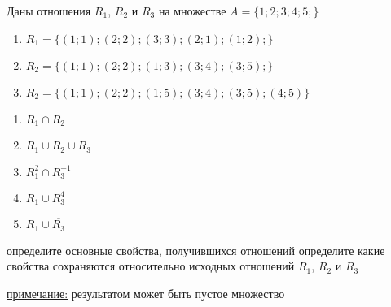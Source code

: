\question
Даны отношения $R_1$, $R_2$ и $R_3$ на множестве $A = \{1; 2; 3; 4; 5;\}$ 
\begin{enumerate}
	\renewcommand{\labelenumi}{\alph{enumi})}
	\item $R_1 = \{(1; 1); (2; 2); (3; 3); (2; 1); (1; 2); \}$
	\item $R_2 = \{(1; 1); (2; 2); (1; 3); (3; 4); (3; 5);\}$
	\item $R_2 = \{(1; 1); (2; 2);  (1; 5); (3; 4); (3; 5); (4; 5)\}$
\end{enumerate}

\begin{enumerate}
	\renewcommand{\labelenumi}{\alph{enumi})}
	\item $R_1 \cap R_2$
	\item $R_1 \cup R_2 \cup R_3$
	\item $R_1^2 \cap R_3^{-1}$
	\item $R_1 \cup R_3^4$
	\item $R_1 \cup \overline{R_3}$
\end{enumerate}

определите основные свойства, получившихся отношений
определите какие свойства сохраняются относительно исходных отношений $R_1$, $R_2$ и $R_3$ 

\underline{примечание:} результатом может быть пустое множество